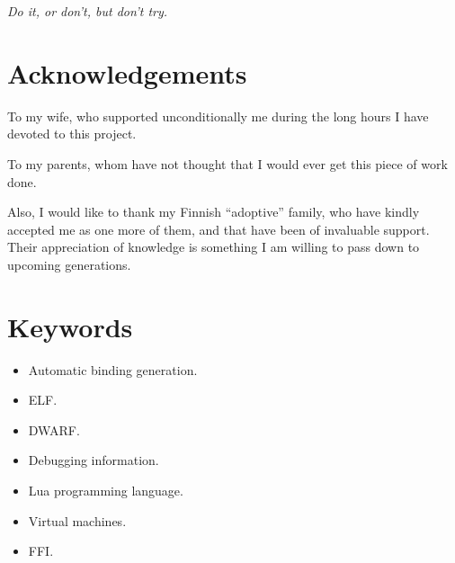 \documentclass[a4paper,
	fontsize=12pt,
	titlepage=firstiscover,
	chapterprefix=true,
	appendixprefix=true,
	headings=big,
	headsepline,
	toc=bibliographynumbered,
	twoside]{scrbook}
\begin{document}
\frontmatter

\clearpage
\listoftodos

\cleardoublepage
\begin{minipage}[t][6cm][l]{\textwidth}
	\vspace{10cm}
	\begin{flushright}
		\textit{Do it, or don't, but don't try.}
	\end{flushright}
\end{minipage}

\cleardoublepage
\chapter*{Acknowledgements}


\begin{minipage}{0.6\textwidth}
\begin{raggedleft} \itshape

To my wife, who supported unconditionally me during the long hours I have
devoted to this project.

\vspace{2cm}

To my parents, whom have not thought that I would ever get this piece of work
done.

\vspace{2cm}

Also, I would like to thank my Finnish “adoptive” family, who have kindly
accepted me as one more of them, and that have been of invaluable support.
Their appreciation of knowledge is something I am willing to pass down to
upcoming generations.

\end{raggedleft}
\end{minipage}


\cleardoublepage


\cleardoublepage
\chapter*{Keywords}
\begin{itemize}
	\item Automatic binding generation.
	\item ELF.
	\item DWARF.
	\item Debugging information.
	\item Lua programming language.
	\item Virtual machines.
	\item FFI.
\end{itemize}
\end{document}
